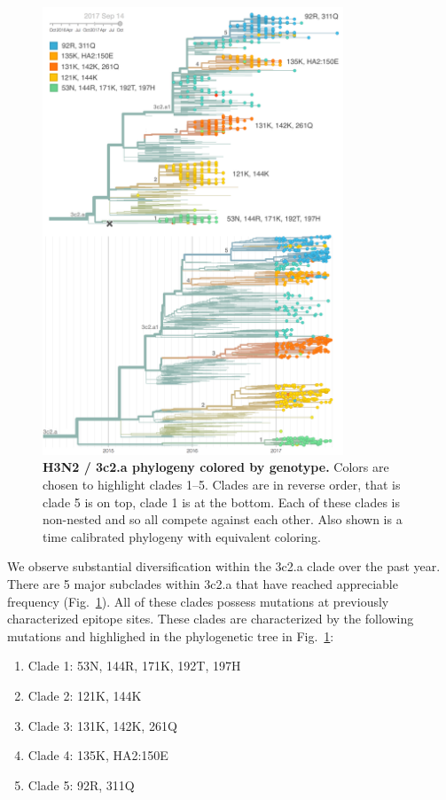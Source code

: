 \documentclass[11pt,oneside,letterpaper]{article}
\newcommand{\FIG}[1]{Fig.~\ref{#1}}
\begin{document}
\clearpage
\begin{figure}[H]
  \centering
  \includegraphics[width=0.8\textwidth]{../figures/sep-2017/h3n2_tree_with_timetree.png}
  \caption{\textbf{H3N2 / 3c2.a phylogeny colored by genotype.} Colors are chosen to highlight clades 1--5. Clades are in reverse order, that is clade 5 is on top, clade 1 is at the bottom. Each of these clades is non-nested and so all compete against each other. Also shown is a time calibrated phylogeny with equivalent coloring.
  }
  \label{h3n2_tree_with_timetree}
\end{figure}


We observe substantial diversification within the 3c2.a clade over the
past year. There are 5 major subclades within 3c2.a that have reached
appreciable frequency (\FIG{h3n2_tree_with_timetree}). All of these clades possess mutations at previously characterized
epitope sites. These clades are characterized by the following
mutations and highlighed in the phylogenetic tree in \FIG{h3n2_tree_with_timetree}:

\begin{enumerate}
\item  Clade 1: 53N, 144R, 171K, 192T, 197H
\item  Clade 2: 121K, 144K
\item  Clade 3: 131K, 142K, 261Q
\item  Clade 4: 135K, HA2:150E
\item  Clade 5: 92R, 311Q
\end{enumerate}
\end{document}
